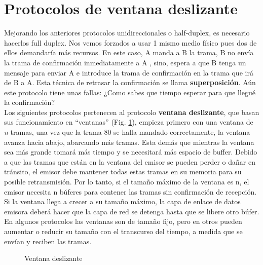 \documentclass[
	12pt, %
	fleqn, %
	a4paper, %
	oneside, %
]{LegrandOrangeBook}
\begin{document}
\section{Protocolos de ventana deslizante}
Mejorando los anteriores protocolos unidireccionales o half-duplex, es necesario hacerlos full duplex. Nos vemos forzados a usar 1 mismo medio físico pues dos de ellos demandaría más recursos. En este caso, A manda a B la trama, B no envía la trama de confirmación inmediatamente a A , sino,  espera a que B tenga un mensaje para enviar A e introduce la trama de confirmación en la trama que irá de B a A. Esta técnica de retrasar la confirmación se llama \textbf{superposición}. Aún este protocolo tiene unas fallas: ¿Como sabes que tiempo esperar para que llegué la confirmación?\\
Los siguientes protocolos pertenecen al protocolo \textbf{ventana deslizante}, que basan sus funcionamiento en ``ventanas'' (Fig. \ref{fig: Ventana deslizante}), empieza primero con una ventana de \textit{n} tramas, una vez que la trama 80 se halla mandado correctamente, la ventana avanza hacia abajo, abarcando más tramas. Esta demás que mientras la ventana sea más grande tomará más tiempo y se necesitará más espacio de buffer. Debido a que las tramas que están en la ventana del emisor se pueden perder o dañar en tránsito, el emisor debe mantener todas estas tramas en su memoria para su posible retransmisión. Por lo tanto, si el tamaño máximo de la ventana es n, el emisor necesita n búferes para contener las tramas sin confirmación de recepción. Si la ventana llega a crecer a su tamaño máximo, la capa de enlace de datos emisora deberá hacer que la capa de red se detenga hasta que se libere otro búfer. En algunos protocolos las ventanas son de tamaño fijo, pero en otros pueden aumentar o reducir su tamaño con el transcurso del tiempo, a medida que se envían y reciben
las tramas.
\begin{figure}[]
\centering
{}
\caption{Ventana deslizante}
\label{fig: Ventana deslizante}
\end{figure}
\end{document}
